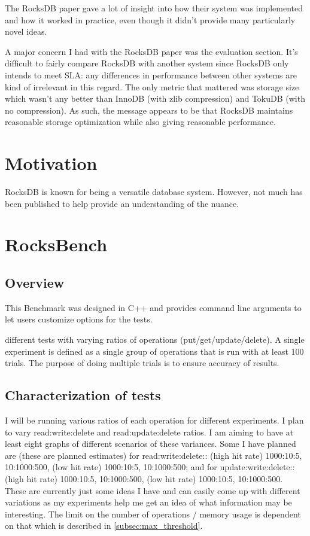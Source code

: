 \documentclass[twocolumn,11pt]{article}
\begin{document}

The RocksDB paper gave a lot of insight into how their system was implemented
and how it worked in practice, even though it didn't provide many particularly
novel ideas.

A major concern I had with the RocksDB paper was the evaluation section. It's
difficult to fairly compare RocksDB with another system since RocksDB only
intends to meet SLA: any differences in performance between other systems are
kind of irrelevant in this regard. The only metric that mattered was storage
size which wasn't any better than InnoDB (with zlib compression) and TokuDB
(with no compression). As such, the message appears to be that RocksDB maintains
reasonable storage optimization while also giving reasonable performance.

\section{Motivation}

RocksDB is known for being a versatile database system. However, not much has
been published to help provide an understanding of the nuance.

\section{RocksBench}

\subsection{Overview}

This Benchmark was designed in C++ and provides command line arguments to let
users customize options for the tests.

different tests with varying ratios of operations (put/get/update/delete). A
single experiment is defined as a single group of operations that is run with at
least 100 trials. The purpose of doing multiple trials is to ensure accuracy of
results.

\subsection{Characterization of tests}
\label{subsec:characterization_tests}

I will be running various ratios of each operation for different experiments. I
plan to vary read:write:delete and read:update:delete ratios. I am aiming to
have at least eight graphs of different scenarios of these variances. Some I
have planned are (these are planned estimates) for read:write:delete:: (high hit
rate) 1000:10:5, 10:1000:500, (low hit rate) 1000:10:5, 10:1000:500; and for
update:write:delete:: (high hit rate) 1000:10:5, 10:1000:500, (low hit rate)
1000:10:5, 10:1000:500. These are currently just some ideas I have and can
easily come up with different variations as my experiments help me get an idea
of what information may be interesting. The limit on the number of operations /
memory usage is dependent on that which is described in
\ref{subsec:max_threshold}.
\end{document}
